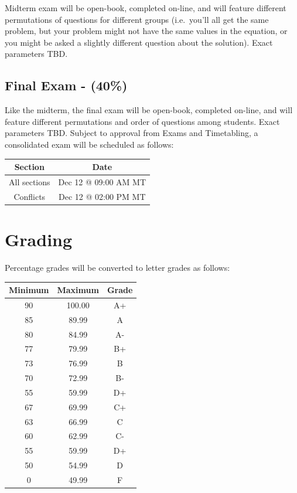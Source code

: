 \documentclass[11pt,]{article}
\begin{document}
Midterm exam will be open-book, completed on-line, and will feature
different permutations of questions for different groups (i.e.~you'll
all get the same problem, but your problem might not have the same
values in the equation, or you might be asked a slightly different
question about the solution). Exact parameters TBD.

\hypertarget{final-exam---40}{%
\subsection{Final Exam - (40\%)}\label{final-exam---40}}

Like the midterm, the final exam will be open-book, completed on-line,
and will feature different permutations and order of questions among
students. Exact parameters TBD. Subject to approval from Exams and
Timetabling, a consolidated exam will be scheduled as follows:

\begin{table}[H]
\centering
\begin{tabular}{cc}
\toprule
Section & Date\\
\midrule
All sections & Dec 12 @ 09:00 AM MT\\
Conflicts & Dec 12 @ 02:00 PM MT\\
\bottomrule
\end{tabular}
\end{table}

\hypertarget{grading}{%
\section{Grading}\label{grading}}

Percentage grades will be converted to letter grades as follows:

\begin{table}[H]
\centering
\begin{tabular}{ccc}
\toprule
Minimum & Maximum & Grade\\
\midrule
90 & 100.00 & A+\\
85 & 89.99 & A\\
80 & 84.99 & A-\\
77 & 79.99 & B+\\
73 & 76.99 & B\\
70 & 72.99 & B-\\
55 & 59.99 & D+\\
67 & 69.99 & C+\\
63 & 66.99 & C\\
60 & 62.99 & C-\\
55 & 59.99 & D+\\
50 & 54.99 & D\\
0 & 49.99 & F\\
\bottomrule
\end{tabular}
\end{table}
\end{document}
